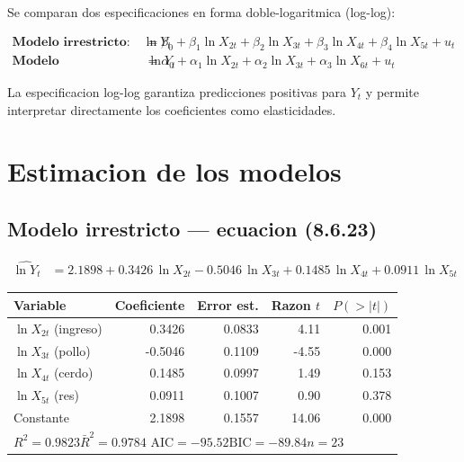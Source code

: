 \documentclass[12pt, letterpaper]{article}
\begin{document}
Se comparan dos especificaciones en forma doble-logaritmica (log-log):

\begin{align}
  \textbf{Modelo irrestricto:} \quad
  \ln Y_t &= \beta_0 + \beta_1 \ln X_{2t} + \beta_2 \ln X_{3t}
             + \beta_3 \ln X_{4t} + \beta_4 \ln X_{5t} + u_t
  \label{eq:irrestricto}\\[6pt]
  \textbf{Modelo restringido:} \quad
  \ln Y_t &= \alpha_0 + \alpha_1 \ln X_{2t} + \alpha_2 \ln X_{3t}
             + \alpha_3 \ln X_{6t} + u_t
  \label{eq:restringido}
\end{align}

La especificacion log-log garantiza predicciones positivas para $Y_t$ y
permite interpretar directamente los coeficientes como elasticidades.

\section{Estimacion de los modelos}

\subsection{Modelo irrestricto --- ecuacion (8.6.23)}

\begin{align}
  \widehat{\ln Y_t} &= 2.1898 + 0.3426\,\ln X_{2t} - 0.5046\,\ln X_{3t}
                       + 0.1485\,\ln X_{4t} + 0.0911\,\ln X_{5t}
  \label{eq:estimA}
\end{align}

\begin{center}
\renewcommand{\arraystretch}{1.3}
\small
\begin{tabular}{lrrrr}
\toprule
\textbf{Variable} & \textbf{Coeficiente} & \textbf{Error est.} & \textbf{Razon $t$} & \textbf{$P(>|t|)$} \\
\midrule
$\ln X_{2t}$ (ingreso)  &  0.3426 & 0.0833 &  4.11 & 0.001 \\
$\ln X_{3t}$ (pollo)    & -0.5046 & 0.1109 & -4.55 & 0.000 \\
$\ln X_{4t}$ (cerdo)    &  0.1485 & 0.0997 &  1.49 & 0.153 \\
$\ln X_{5t}$ (res)      &  0.0911 & 0.1007 &  0.90 & 0.378 \\
Constante               &  2.1898 & 0.1557 & 14.06 & 0.000 \\
\midrule
\multicolumn{5}{l}{$R^2 = 0.9823$\quad $\bar{R}^2 = 0.9784$\quad
  $\text{AIC} = -95.52$\quad $\text{BIC} = -89.84$\quad $n = 23$} \\
\bottomrule
\end{tabular}
\end{center}
\end{document}
